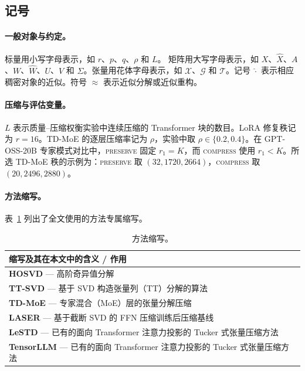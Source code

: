 \documentclass[11pt]{article}
\begin{document}
\newpage
\begin{appendixpart}
\vspace{-4mm}
\tableofcontents
\allowdisplaybreaks
\newpage

\section{记号}
\label{app:notation}

\paragraph{一般对象与约定。}
标量用小写字母表示，如 $r$、$p$、$q$、$\rho$ 和 $L$。
矩阵用大写字母表示，如 $X$、$\widehat{X}$、$A$、$W$、$\widehat{W}$、$U$、$V$ 和 $\Sigma$。张量用花体字母表示，如 $\mathcal{X}$、$\mathcal{G}$ 和 $\mathcal{T}$。记号 $\widehat{\cdot}$ 表示相应稠密对象的近似。符号 $\approx$ 表示近似分解或近似重构。


\paragraph{压缩与评估变量。}
$L$ 表示质量--压缩权衡实验中连续压缩的 Transformer 块的数目。LoRA 修复秩记为 $r=16$。TD-MoE 的逐层压缩率记为 $\rho$，实验中取 $\rho \in \{0.2,0.4\}$。在 GPT-OSS-20B 专家模式对比中，\textsc{preserve} 固定 $r_1=K$，而 \textsc{compress} 使用 $r_1<K$。所选 TD-MoE 秩的示例为：\textsc{preserve} 取 $(32,1720,2664)$，\textsc{compress} 取 $(20,2496,2880)$。

\paragraph{方法缩写。}
表~\ref{tab:method_abbreviations} 列出了全文使用的方法专属缩写。

\begin{table}[htbp]
\centering
\caption{方法缩写。}
\label{tab:method_abbreviations}
\small
\begin{tabular}{@{}p{\columnwidth}@{}}
\toprule
\textbf{缩写及其在本文中的含义 / 作用} \\
\midrule
\textbf{HOSVD} --- 高阶奇异值分解 \\
\textbf{TT-SVD} --- 基于 SVD 构造张量列（TT）分解的算法 \\
\textbf{TD-MoE} --- 专家混合（MoE）层的张量分解压缩 \\
\textbf{LASER} --- 基于截断 SVD 的 FFN 压缩训练后压缩基线 \\
\textbf{LeSTD} --- 已有的面向 Transformer 注意力投影的 Tucker 式张量压缩方法 \\
\textbf{TensorLLM} --- 已有的面向 Transformer 注意力投影的 Tucker 式张量压缩方法 \\
\bottomrule
\end{tabular}
\end{table}


\end{appendixpart}
\end{document}
